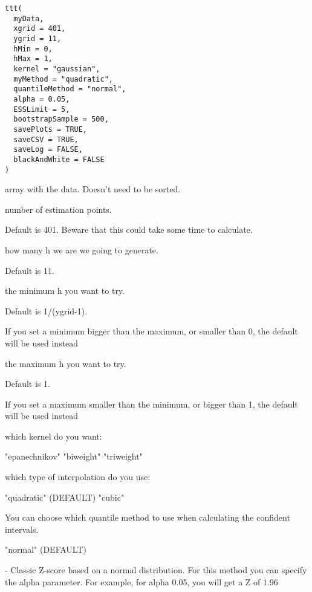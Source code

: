 \documentclass[letterpaper]{book}
\begin{document}
%
\begin{Usage}
\begin{verbatim}
ttt(
  myData,
  xgrid = 401,
  ygrid = 11,
  hMin = 0,
  hMax = 1,
  kernel = "gaussian",
  myMethod = "quadratic",
  quantileMethod = "normal",
  alpha = 0.05,
  ESSLimit = 5,
  bootstrapSample = 500,
  savePlots = TRUE,
  saveCSV = TRUE,
  saveLog = FALSE,
  blackAndWhite = FALSE
)
\end{verbatim}
\end{Usage}
%
\begin{Arguments}
\begin{ldescription}
\item[\code{myData}] array with the data. Doesn't need to be sorted.

\item[\code{xgrid}] number of estimation points.

Default is 401. Beware that this could take some
time to calculate.

\item[\code{ygrid}] how many h we are we going to generate.

Default is 11.

\item[\code{hMin}] the minimum h you want to try.

Default is 1/(ygrid-1).

If you set a minimum bigger than the maximum, or smaller than
0, the default will be used instead

\item[\code{hMax}] the maximum h you want to try.

Default is 1.

If you set a maximum smaller than the minimum, or bigger than
1, the default will be used instead

\item[\code{kernel}] which kernel do you want:

"epanechnikov"
"biweight"
"triweight"

\item[\code{myMethod}] which type of interpolation do you use:

"quadratic" (DEFAULT)
"cubic"

\item[\code{quantileMethod}] You can choose which quantile method to use when
calculating the confident intervals.

"normal" (DEFAULT)

- Classic Z-score based on a normal distribution.
For this method you can specify the alpha
parameter. For example, for alpha 0.05, you will
get a Z of 1.96


\end{ldescription}
\end{Arguments}
\end{document}
